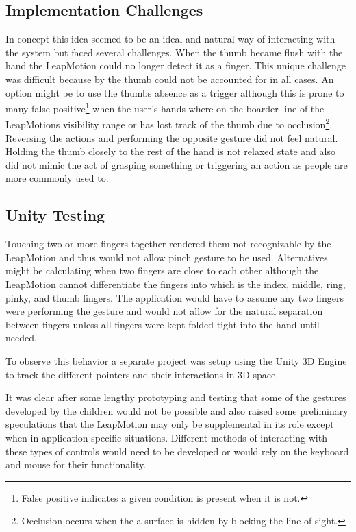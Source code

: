 \subsection{Implementation Challenges}
In concept this idea seemed to be an ideal and natural way of interacting with the system but faced several challenges. When the thumb became flush with the hand the LeapMotion could no longer detect it as a finger. This unique challenge was difficult because by the thumb could not be accounted for in all cases. An option might be to use the thumbs absence as a trigger although this is prone to many false positive\footnote{False positive indicates a given condition is present when it is not.} when the user's hands where on the boarder line of the LeapMotions visibility range or has lost track of the thumb due to occlusion\footnote{Occlusion occurs when the a surface is hidden by blocking the line of sight.}. Reversing the actions and performing the opposite gesture did not feel natural. Holding the thumb closely to the rest of the hand is not relaxed state and also did not mimic the act of grasping something or triggering an action as people are more commonly used to. 


\subsection{Unity Testing}
Touching two or more fingers together rendered them not recognizable by the LeapMotion and thus would not allow pinch gesture to be used. Alternatives might be calculating when two fingers are close to each other although the LeapMotion cannot differentiate the fingers into which is the index, middle, ring, pinky, and thumb fingers. The application would have to assume any two fingers were performing the gesture and would not allow for the natural separation between fingers unless all fingers were kept folded tight into the hand until needed. 

To observe this behavior a separate project was setup using the Unity 3D Engine to track the different pointers and their interactions in 3D space.\cite{unity}

It was clear after some lengthy prototyping and testing that some of the gestures developed by the children would not be possible and also raised some preliminary speculations that the LeapMotion may only be supplemental in its role except when in application specific situations. Different methods of interacting with these types of controls would need to be developed or would rely on the keyboard and mouse for their functionality.

